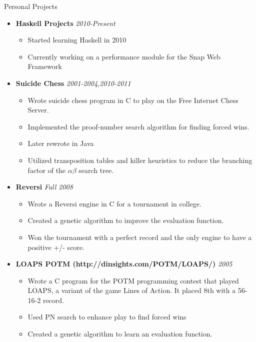 \documentclass[11pt,oneside]{article}
\newenvironment{ressection}[1]{
	\vspace{4pt}
	{\fontfamily{phv}\selectfont\Large#1}
	\begin{itemize}
	\vspace{3pt}
}{
	\end{itemize}
}
\newcommand{\ressubitem}[1]{
	\vspace{-1pt}
	\item \begin{flushleft} #1 \end{flushleft}
}
\newcommand{\resbigitemb}[2]{
	\vspace{-5pt}
	\item{\textbf{#1} \hfill \textit{#2}}
}
\newenvironment{resdateditem}[2]{
	\resbigitemb{#1}{#2}
	\vspace{-2pt}
	\begin{itemize}
}{
	\end{itemize}
}
\begin{document}
\begin{ressection}{Personal Projects}
  
  \begin{resdateditem}{Haskell Projects}{2010-Present}
    \ressubitem{Started learning Haskell in 2010}
    \ressubitem{Currently working on a performance module for the Snap Web Framework}
  \end{resdateditem}


  \begin{resdateditem}{Suicide Chess}{2001-2004,2010-2011}
    \ressubitem{Wrote suicide chess program in C to play on the Free Internet Chess Server.}
    \ressubitem{Implemented the proof-number search algorithm for finding forced wins.}
    \ressubitem{Later rewrote in Java}
    \ressubitem{Utilized transposition tables and killer heuristics to reduce the branching factor of the $\alpha\beta$ search tree.}
  \end{resdateditem}

  \begin{resdateditem}{Reversi}{Fall 2008}
    \ressubitem{Wrote a Reversi engine in C for a tournament in college.}
		\ressubitem{Created a genetic algorithm to improve the evaluation function.}
		\ressubitem{Won the tournament with a perfect record and the only engine to have a positive +/- score.}
  \end{resdateditem}
	

  \begin{resdateditem}{LOAPS POTM (http://dinsights.com/POTM/LOAPS/)}{2005}
    \ressubitem{Wrote a C program for the POTM programming contest that
    played LOAPS, a variant of the game Lines of Action.  It placed 8th
    with a 56-16-2 record.}
    \ressubitem{Used PN search to enhance play to find forced wins}
    \ressubitem{Created a genetic algorithm to learn an evaluation function.}
  \end{resdateditem}

\end{ressection}
\end{document}
